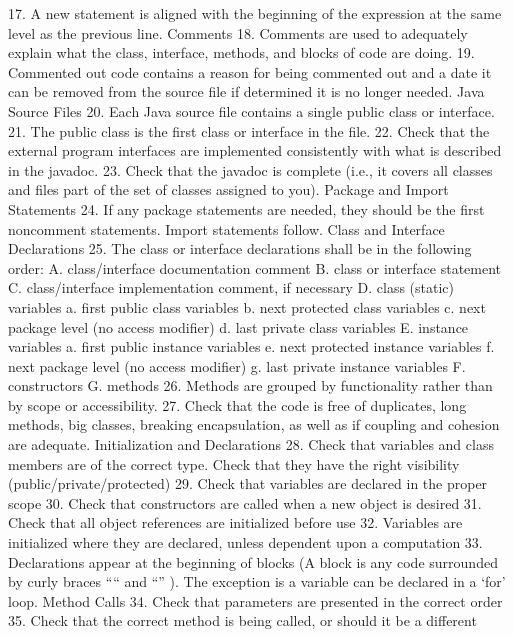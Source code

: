 17. A	 new	 statement	 is	 aligned	 with	 the	 beginning	 of	 the	 expression	 at	 the	
same	level	as	the	previous	line.
Comments
18. Comments	 are	 used	 to	 adequately	 explain what	 the	 class,	 interface,	
methods,	and	blocks	of	code	are	doing.
19. Commented	 out	 code	 contains	a	 reason	 for	 being	 commented	 out	and	a	
date	it	can	be	removed	 from	 the	source	 file	if	determined	it	is	no	longer	
needed.
Java	Source	Files
20. Each	Java	source	file	contains	a	single	public	class	or	interface.
21. The	public	class	is	the	first	class	or	interface	in	the	file.
22. Check	that the	external	program	interfaces are	implemented	consistently	
with	what	is	described	in	the	javadoc.
23. Check	that the	javadoc is complete (i.e.,	it covers all	classes	and	files	part	
of	the	set	of	classes	assigned	to	you).
Package	and	Import	Statements
24. If	 any	 package	 statements	 are	 needed,	 they	 should	 be	 the	 first	 noncomment
statements.		Import	statements	follow.
Class	and	Interface	Declarations
25. The	class	or	interface	declarations	shall	be	in	the	following	order:
A. class/interface	documentation	comment
B. class	or	interface	statement
C. class/interface	implementation	comment,	if	necessary
D. class	(static)	variables
a. first	public class	variables
b. next	protected class	variables
c. next	package	level	(no	access	modifier)
d. last	private class	variables
E. instance	variables
a. first	public	instance	variables
e. next	protected	instance	variables
f. next	package	level	(no	access	modifier)
g. last	private	instance	variables
F. constructors
G. methods	
26. Methods	 are	 grouped	 by	 functionality	 rather	 than	 by	 scope	 or	
accessibility.
27. Check	 that the	 code is free	 of	 duplicates,	 long	 methods,	 big	 classes,	
breaking	encapsulation,	as	well	as	if	coupling	and	cohesion	are	adequate.
Initialization	and	Declarations
28. Check	that variables	and	class	members	are	of	the	correct	type.	Check	that	
they	have	the	right	visibility	(public/private/protected)
29. Check	that variables	are	declared	in	the	proper	scope	
30. Check	that constructors	are called	when	a	new	object	is	desired
31. Check	that all	object	references are initialized	before	use	
32. Variables	are	initialized	where	they	are	declared,	unless	dependent	upon	
a	computation
33. Declarations	 appear	 at	 the	 beginning	 of	 blocks	 (A	 block	 is	 any	 code	
surrounded	by	curly	braces	“{“	and	“}”	).		The	exception	is	a	variable	can	
be	declared	in	a	‘for’	loop.
Method	Calls
34. Check	that parameters are	presented	in	the	correct	order
35. Check	 that the	correct	method is being	called,	or	should	it	be	a	different	
